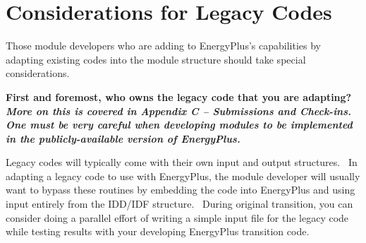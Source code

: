 \section{Considerations for Legacy Codes}\label{considerations-for-legacy-codes}

Those module developers who are adding to EnergyPlus's capabilities by adapting existing codes into the module structure should take special considerations.

\textbf{First and foremost, who owns the legacy code that you are adapting?\emph{~ More on this is covered in Appendix C -- Submissions and Check-ins.~ One must be very careful when developing modules to be implemented in the publicly-available version of EnergyPlus.}}

Legacy codes will typically come with their own input and output structures.~ In adapting a legacy code to use with EnergyPlus, the module developer will usually want to bypass these routines by embedding the code into EnergyPlus and using input entirely from the IDD/IDF structure.~ During original transition, you can consider doing a parallel effort of writing a simple input file for the legacy code while testing results with your developing EnergyPlus transition code.
